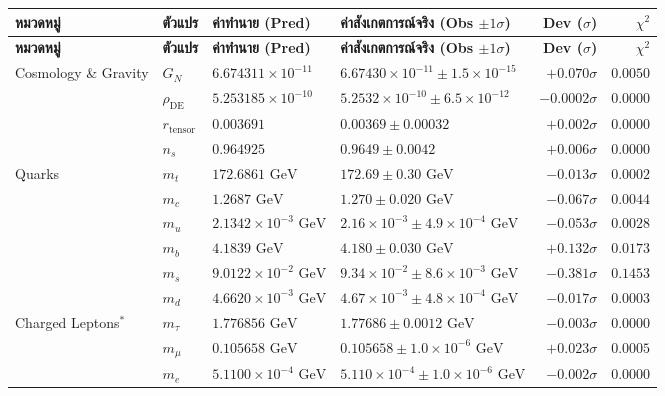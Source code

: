 \documentclass[11pt, a4paper]{article}
\begin{document}
{\small
\setlength{\tabcolsep}{4pt}
\begin{longtable}{p{2.5cm} l l p{3.9cm} r r}
\toprule
\textbf{หมวดหมู่} & \textbf{ตัวแปร} & \textbf{ค่าทำนาย (Pred)} & \textbf{ค่าสังเกตการณ์จริง (Obs $\pm 1\sigma$)} & \textbf{Dev ($\sigma$)} & \textbf{$\chi^2$} \\
\midrule
\endfirsthead
\toprule
\textbf{หมวดหมู่} & \textbf{ตัวแปร} & \textbf{ค่าทำนาย (Pred)} & \textbf{ค่าสังเกตการณ์จริง (Obs $\pm 1\sigma$)} & \textbf{Dev ($\sigma$)} & \textbf{$\chi^2$} \\
\midrule
\endhead
\bottomrule
\endfoot
Cosmology \& Gravity & $G_N$ & $6.674311 \times 10^{-11}$ & $6.67430 \times 10^{-11} \pm 1.5 \times 10^{-15}$ & $+0.070\sigma$ & $0.0050$ \\
 & $\rho_{\text{DE}}$ & $5.253185 \times 10^{-10}$ & $5.2532 \times 10^{-10} \pm 6.5 \times 10^{-12}$ & $-0.0002\sigma$ & $0.0000$ \\
 & $r_{\text{tensor}}$ & $0.003691$ & $0.00369 \pm 0.00032$ & $+0.002\sigma$ & $0.0000$ \\
 & $n_s$ & $0.964925$ & $0.9649 \pm 0.0042$ & $+0.006\sigma$ & $0.0000$ \\
\midrule
Quarks & $m_t$ & $172.6861\text{ GeV}$ & $172.69 \pm 0.30\text{ GeV}$ & $-0.013\sigma$ & $0.0002$ \\
 & $m_c$ & $1.2687\text{ GeV}$ & $1.270 \pm 0.020\text{ GeV}$ & $-0.067\sigma$ & $0.0044$ \\
 & $m_u$ & $2.1342 \times 10^{-3}\text{ GeV}$ & $2.16 \times 10^{-3} \pm 4.9 \times 10^{-4}\text{ GeV}$ & $-0.053\sigma$ & $0.0028$ \\
 & $m_b$ & $4.1839\text{ GeV}$ & $4.180 \pm 0.030\text{ GeV}$ & $+0.132\sigma$ & $0.0173$ \\
 & $m_s$ & $9.0122 \times 10^{-2}\text{ GeV}$ & $9.34 \times 10^{-2} \pm 8.6 \times 10^{-3}\text{ GeV}$ & $-0.381\sigma$ & $0.1453$ \\
 & $m_d$ & $4.6620 \times 10^{-3}\text{ GeV}$ & $4.67 \times 10^{-3} \pm 4.8 \times 10^{-4}\text{ GeV}$ & $-0.017\sigma$ & $0.0003$ \\
\midrule
Charged Leptons$^*$ & $m_\tau$ & $1.776856\text{ GeV}$ & $1.77686 \pm 0.0012\text{ GeV}$ & $-0.003\sigma$ & $0.0000$ \\
 & $m_\mu$ & $0.105658\text{ GeV}$ & $0.105658 \pm 1.0 \times 10^{-6}\text{ GeV}$ & $+0.023\sigma$ & $0.0005$ \\
 & $m_e$ & $5.1100 \times 10^{-4}\text{ GeV}$ & $5.110 \times 10^{-4} \pm 1.0 \times 10^{-6}\text{ GeV}$ & $-0.002\sigma$ & $0.0000$ \\

\end{longtable}}
\end{document}
